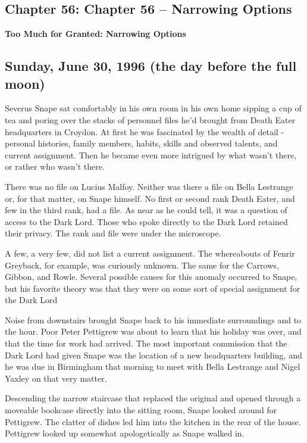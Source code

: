 \documentclass[a4paper,11pt]{article}
\begin{document}
\subsection{Chapter 56: Chapter 56 – Narrowing Options}

\textbf{Too Much for Granted: Narrowing Options}

\subsection{Sunday, June 30, 1996 (the day before the full moon)}

Severus Snape sat comfortably in his own room in his own home sipping a cup of tea and poring over the stacks of personnel files he'd brought from Death Eater headquarters in Croydon. At first he was fascinated by the wealth of detail - personal histories, family members, habits, skills and observed talents, and current assignment. Then he became even more intrigued by what wasn't there, or rather who wasn't there.

There was no file on Lucius Malfoy. Neither was there a file on Bella Lestrange or, for that matter, on Snape himself. No first or second rank Death Eater, and few in the third rank, had a file. As near as he could tell, it was a question of access to the Dark Lord. Those who spoke directly to the Dark Lord retained their privacy. The rank and file were under the microscope.

A few, a very few, did not list a current assignment. The whereabouts of Fenrir Greyback, for example, was curiously unknown. The same for the Carrows, Gibbon, and Rowle. Several possible causes for this anomaly occurred to Snape, but his favorite theory was that they were on some sort of special assignment for the Dark Lord

Noise from downstairs brought Snape back to his immediate surroundings and to the hour. Poor Peter Pettigrew was about to learn that his holiday was over, and that the time for work had arrived. The most important commission that the Dark Lord had given Snape was the location of a new headquarters building, and he was due in Birmingham that morning to meet with Bella Lestrange and Nigel Yaxley on that very matter.

Descending the narrow staircase that replaced the original and opened through a moveable bookcase directly into the sitting room, Snape looked around for Pettigrew. The clatter of dishes led him into the kitchen in the rear of the house. Pettigrew looked up somewhat apologetically as Snape walked in.
\end{document}
